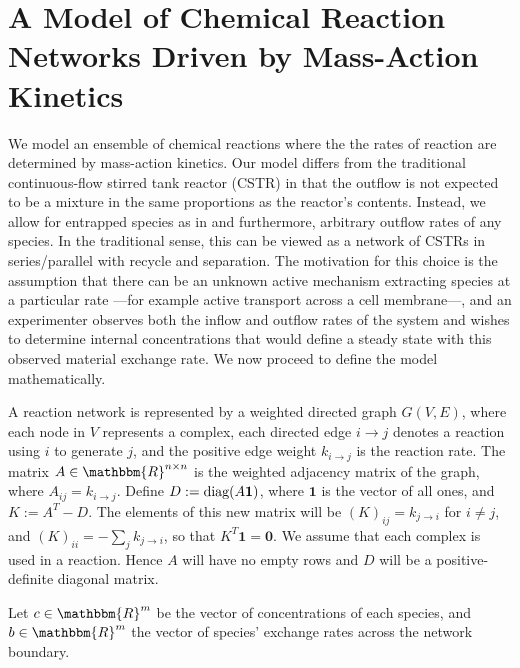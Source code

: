 \documentclass[smallextended]{svjour3}       %
\newcounter{sent}
\newcommand*{\diag}{\mbox{\rm diag}}
\newcommand*{\0}{\mathbf{0}}
\newcommand*{\1}{\mathbf{1}}
\newcommand*{\R}{\mathbbm{R}}
\begin{document}
\section{A Model of Chemical Reaction Networks Driven by Mass-Action Kinetics}
\label{section:crnt-model} 
We model an ensemble of chemical reactions where the the rates of reaction are
determined by mass-action kinetics. Our model differs from the traditional continuous-flow
stirred tank reactor (CSTR) in that the outflow is not expected to be a
mixture in the same proportions as the reactor's contents. Instead, we allow
for entrapped species as in \cite{feinberg-entrapped} and furthermore, arbitrary
outflow rates of any species. In the traditional sense, this can be viewed as a network of 
CSTRs in series/parallel with recycle and separation. The motivation for this choice is 
the assumption that there can be an unknown active mechanism extracting species at a
particular rate ---for example active transport across a cell membrane---, and an
experimenter observes both the inflow and outflow rates of the system and wishes to
determine internal concentrations that would define a steady state with this
observed material exchange rate. We now proceed to define the model
mathematically.

A reaction network is represented by a weighted directed graph
$G(V,E)$, where each node in $V$ represents a complex, each directed edge
$i\rightarrow j$ denotes a reaction using $i$ to generate $j$, and the
positive edge weight $k_{i\rightarrow j}$ is the reaction rate. The matrix $A
\in \R^{n \times n}$ is the weighted adjacency matrix of the graph, where
$A_{ij}=k_{i\rightarrow j}$.  Define $D := \diag(A\1)$, where $\1$ is the
vector of all ones, and $K := A^T-D$.  The elements of this new matrix will
be $(K)_{ij} = k_{j \rightarrow i}$ for $i \neq j$, and $(K)_{ii} = -\sum_j
k_{j \rightarrow i}$, so that $K^T \1 = \0$.  We assume that each complex
is used in a reaction. Hence $A$ will have no empty rows and $D$ will 
be a positive-definite diagonal matrix.

Let $c \in \R^m$ be the vector of concentrations of each species, and $b \in
\R^m$ the vector of species' exchange rates across the network boundary.
\end{document}

